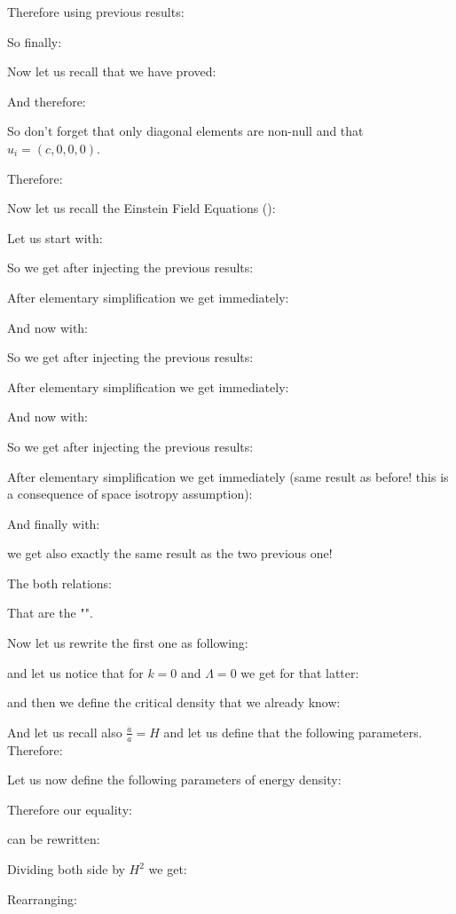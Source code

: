 	Therefore using previous results:
	
	So finally:
	
	Now let us recall that we have proved:
	
	And therefore:
	
	So don't forget that only diagonal elements are non-null and that $u_i=(c,0,0,0)$.
	
	Therefore:
	
	Now let us recall the Einstein Field Equations ():
	
	Let us start with:
	
	So we get after injecting the previous results:
	
	After elementary simplification we get immediately:
	
	And now with:
	
	So we get after injecting the previous results:
	
	After elementary simplification we get immediately:
	
	
	And now with:
	
	So we get after injecting the previous results:
	
	After elementary simplification we get immediately (same result as before! this is a consequence of space isotropy assumption):
	
	
	And finally with:
	
	we get also exactly the same result as the two previous one!
	
	The both relations:
	
	That are the "".
	
	Now let us rewrite the first one as following:
	
	and let us notice that for $k=0$ and $\Lambda=0$ we get for that latter:
	
	and then we define the critical density that we already know:
	
	And let us recall also $\frac{\dot{a}}{a}=H$ and let us define that the following parameters. Therefore:
	
	Let us now define the following parameters of energy density:
	
	Therefore our equality:
	
	can be rewritten:
	
	Dividing both side by $H^2$ we get:
	
	Rearranging:
	

